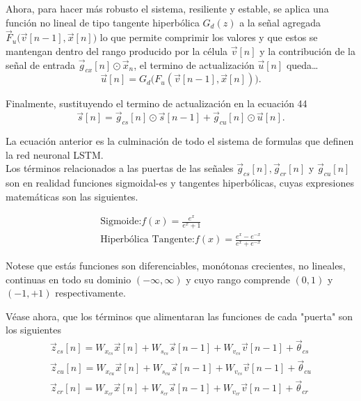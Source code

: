 \documentclass[12pt,letterpaper]{article}
\begin{document}
Ahora, para hacer más robusto el sistema, resiliente y estable, se aplica una función no lineal de tipo tangente hiperbólica $G_d(z)$ a la señal agregada $\vec{F}_u\big( \vec{v}[n-1], \vec{x}[n] \big)$ lo que permite comprimir los valores y que estos se mantengan dentro del rango producido por la célula $\vec{v}[n]$ y la contribución de la señal de entrada $\vec{g}_{cx}[n] \odot \vec{x}_n$, el termino de actualización $\vec{u}[n]$ queda\dots
\begin{equation}
    \vec{u}[n]=G_d\big( F_u(\vec{v}[n-1], \vec{x}[n]) \big).
\end{equation}

Finalmente, sustituyendo el termino de actualización en la ecuación 44
\begin{equation}
    \vec{s}[n] = \vec{g}_{cs}[n]\odot \vec{s}[n-1] + \vec{g}_{cu}[n]\odot \vec{u}[n].
\end{equation}

La ecuación anterior es la culminación de todo el sistema de formulas que definen la red neuronal LSTM.\\

Los términos relacionados a las puertas de las señales $\vec{g}_{cs}[n], \vec{g}_{cr}[n]$ y $\vec{g}_{cu}[n]$ son en realidad funciones sigmoidal-es y tangentes hiperbólicas, cuyas expresiones matemáticas son las siguientes.

\begin{gather}
    \text{Sigmoide:} f(x)= \frac{e^x}{e^x+1}
\\
    \text{Hiperbólica Tangente:} f(x)=\frac{e^x-e^{-x}}{e^x+e^{-x}}  
\end{gather}

Notese que estás funciones son diferenciables, monótonas crecientes, no lineales, continuas en todo su dominio $(-\infty , \infty)$ y cuyo rango comprende $(0,1)$ y $(-1,+1)$ respectivamente.

Véase ahora, que los términos que alimentaran las funciones de cada "puerta" son los siguientes
\begin{gather}
    \vec{z}_{cs}[n] = W_{x_{cs}}\vec{x}[n] + W_{s_{cs}}\vec{s}[n-1]+W_{v_{cs}} \vec{v}[n-1]+\vec{\theta}_{cs}\\
    \vec{z}_{cu}[n] = W_{x_{cu}}\vec{x}[n] + W_{s_{cu}}\vec{s}[n-1]+W_{v_{cs}} \vec{v}[n-1]+\vec{\theta}_{cu}\\
    \vec{z}_{cr}[n] = W_{x_{cr}}\vec{x}[n] + W_{s_{cr}}\vec{s}[n-1]+W_{v_{cr}} \vec{v}[n-1]+\vec{\theta}_{cr}
\end{gather}
\end{document}
